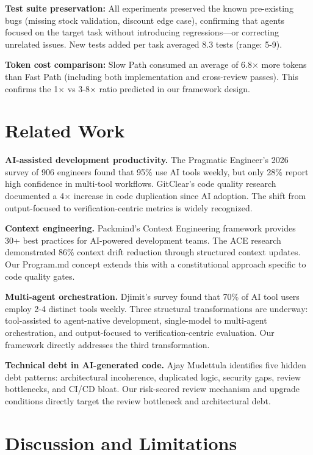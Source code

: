 \documentclass[11pt,a4paper]{article}
\begin{document}
\textbf{Test suite preservation:} All experiments preserved the known pre-existing bugs (missing stock validation, discount edge case), confirming that agents focused on the target task without introducing regressions---or correcting unrelated issues. New tests added per task averaged 8.3 tests (range: 5-9).

\textbf{Token cost comparison:} Slow Path consumed an average of 6.8$\times$ more tokens than Fast Path (including both implementation and cross-review passes). This confirms the 1$\times$ vs 3-8$\times$ ratio predicted in our framework design.

\section{Related Work}

\textbf{AI-assisted development productivity.} The Pragmatic Engineer's 2026 survey of 906 engineers \cite{djimit2026} found that 95\% use AI tools weekly, but only 28\% report high confidence in multi-tool workflows. GitClear's code quality research \cite{gitclear2024} documented a 4$\times$ increase in code duplication since AI adoption. The shift from output-focused to verification-centric metrics is widely recognized.

\textbf{Context engineering.} Packmind's Context Engineering framework \cite{packmind2026} provides 30+ best practices for AI-powered development teams. The ACE research \cite{ace2025} demonstrated 86\% context drift reduction through structured context updates. Our Program.md concept extends this with a constitutional approach specific to code quality gates.

\textbf{Multi-agent orchestration.} Djimit's survey \cite{djimit2026} found that 70\% of AI tool users employ 2-4 distinct tools weekly. Three structural transformations are underway: tool-assisted to agent-native development, single-model to multi-agent orchestration, and output-focused to verification-centric evaluation. Our framework directly addresses the third transformation.

\textbf{Technical debt in AI-generated code.} Ajay Mudettula \cite{mudettula2026} identifies five hidden debt patterns: architectural incoherence, duplicated logic, security gaps, review bottlenecks, and CI/CD bloat. Our risk-scored review mechanism and upgrade conditions directly target the review bottleneck and architectural debt.

\section{Discussion and Limitations}
\end{document}
